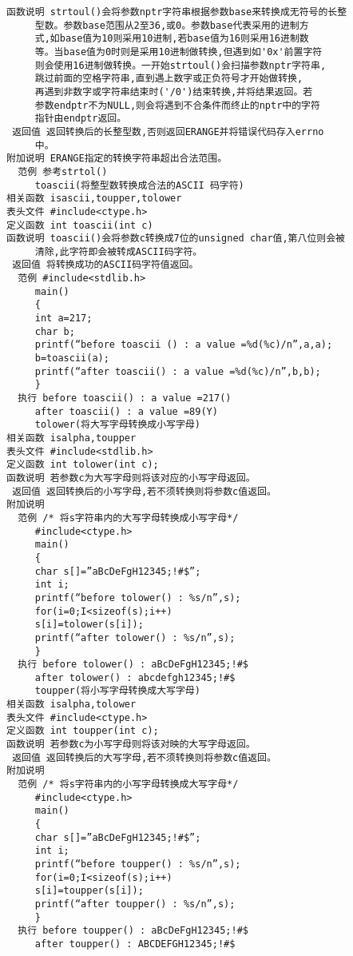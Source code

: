 \begin{verbatim}
函数说明 strtoul()会将参数nptr字符串根据参数base来转换成无符号的长整
     型数。参数base范围从2至36,或0。参数base代表采用的进制方
     式,如base值为10则采用10进制,若base值为16则采用16进制数
     等。当base值为0时则是采用10进制做转换,但遇到如'0x'前置字符
     则会使用16进制做转换。一开始strtoul()会扫描参数nptr字符串,
     跳过前面的空格字符串,直到遇上数字或正负符号才开始做转换,
     再遇到非数字或字符串结束时('/0')结束转换,并将结果返回。若
     参数endptr不为NULL,则会将遇到不合条件而终止的nptr中的字符
     指针由endptr返回。
 返回值 返回转换后的长整型数,否则返回ERANGE并将错误代码存入errno
     中。
附加说明 ERANGE指定的转换字符串超出合法范围。
  范例 参考strtol()
     toascii(将整型数转换成合法的ASCII 码字符)
相关函数 isascii,toupper,tolower
表头文件 #include<ctype.h>
定义函数 int toascii(int c)
函数说明 toascii()会将参数c转换成7位的unsigned char值,第八位则会被
     清除,此字符即会被转成ASCII码字符。
 返回值 将转换成功的ASCII码字符值返回。
  范例 #include<stdlib.h>
     main()
     {
     int a=217;
     char b;
     printf(“before toascii () : a value =%d(%c)/n”,a,a);
     b=toascii(a);
     printf(“after toascii() : a value =%d(%c)/n”,b,b);
     }
  执行 before toascii() : a value =217()
     after toascii() : a value =89(Y)
     tolower(将大写字母转换成小写字母)
相关函数 isalpha,toupper
表头文件 #include<stdlib.h>
定义函数 int tolower(int c);
函数说明 若参数c为大写字母则将该对应的小写字母返回。
 返回值 返回转换后的小写字母,若不须转换则将参数c值返回。
附加说明
  范例 /* 将s字符串内的大写字母转换成小写字母*/
     #include<ctype.h>
     main()
     {
     char s[]=”aBcDeFgH12345;!#$”;
     int i;
     printf(“before tolower() : %s/n”,s);
     for(i=0;I<sizeof(s);i++)
     s[i]=tolower(s[i]);
     printf(“after tolower() : %s/n”,s);
     }
  执行 before tolower() : aBcDeFgH12345;!#$
     after tolower() : abcdefgh12345;!#$
     toupper(将小写字母转换成大写字母)
相关函数 isalpha,tolower
表头文件 #include<ctype.h>
定义函数 int toupper(int c);
函数说明 若参数c为小写字母则将该对映的大写字母返回。
 返回值 返回转换后的大写字母,若不须转换则将参数c值返回。
附加说明
  范例 /* 将s字符串内的小写字母转换成大写字母*/
     #include<ctype.h>
     main()
     {
     char s[]=”aBcDeFgH12345;!#$”;
     int i;
     printf(“before toupper() : %s/n”,s);
     for(i=0;I<sizeof(s);i++)
     s[i]=toupper(s[i]);
     printf(“after toupper() : %s/n”,s);
     }
  执行 before toupper() : aBcDeFgH12345;!#$
     after toupper() : ABCDEFGH12345;!#$



 
\end{verbatim}
